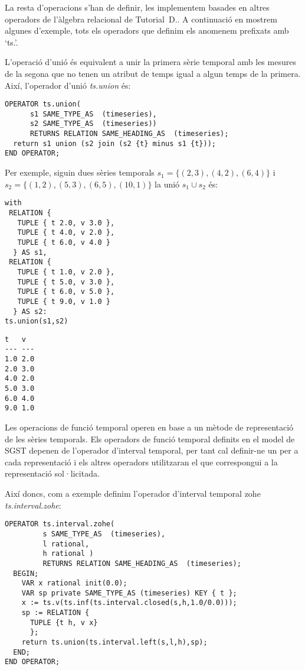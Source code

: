 La resta d'operacions s'han de definir, les implementem basades en
altres operadors de l'àlgebra relacional de Tutorial~D..  A
continuació en mostrem algunes d'exemple, tots els operadors que
definim els anomenem prefixats amb `ts.'.



L'operació d'unió és equivalent a unir la primera sèrie temporal amb
les mesures de la segona que no tenen un atribut de temps igual a
algun temps de la primera. Així, l'operador d'unió \emph{ts.union}
 és:
\begin{lstlisting}[style=tutorialD]
OPERATOR ts.union(
      s1 SAME_TYPE_AS  (timeseries), 
      s2 SAME_TYPE_AS  (timeseries)) 
      RETURNS RELATION SAME_HEADING_AS  (timeseries);
  return s1 union (s2 join (s2 {t} minus s1 {t}));
END OPERATOR;
\end{lstlisting}

Per exemple, siguin dues sèries temporals $s_1=\{(2,3),(4,2),(6,4)\}$ i $s_2=\{(1,2),(5,3),(6,5),(10,1)\}$ la unió $s_1\cup s_2$ és:
\begin{lstlisting}[style=tutorialD]
with 
 RELATION {
   TUPLE { t 2.0, v 3.0 },
   TUPLE { t 4.0, v 2.0 },
   TUPLE { t 6.0, v 4.0 }
  } AS s1,
 RELATION {
   TUPLE { t 1.0, v 2.0 },
   TUPLE { t 5.0, v 3.0 },
   TUPLE { t 6.0, v 5.0 },
   TUPLE { t 9.0, v 1.0 }
  } AS s2: 
ts.union(s1,s2)
\end{lstlisting}
\begin{lstlisting}[style=stdout]
 t   v 
--- ---
1.0 2.0
2.0 3.0
4.0 2.0
5.0 3.0
6.0 4.0
9.0 1.0
\end{lstlisting}



Les operacions de funció temporal operen en base a un mètode de
representació de les sèries temporals. Els operadors de funció
temporal definits en el model de \gls{SGST} depenen de l'operador
d'interval temporal, per tant cal definir-ne un per a cada
representació i els altres operadors utilitzaran el que correspongui a
la representació sol·licitada.



Així doncs, com a exemple definim l'operador d'interval temporal
\gls{zohe} \emph{ts.interval.zohe}:
\begin{lstlisting}[style=tutorialD]
OPERATOR ts.interval.zohe(
         s SAME_TYPE_AS  (timeseries),
         l rational, 
         h rational ) 
         RETURNS RELATION SAME_HEADING_AS  (timeseries);
  BEGIN;
    VAR x rational init(0.0);
    VAR sp private SAME_TYPE_AS (timeseries) KEY { t };
    x := ts.v(ts.inf(ts.interval.closed(s,h,1.0/0.0)));
    sp := RELATION {
      TUPLE {t h, v x}
      };
    return ts.union(ts.interval.left(s,l,h),sp);
  END;
END OPERATOR;
\end{lstlisting}



